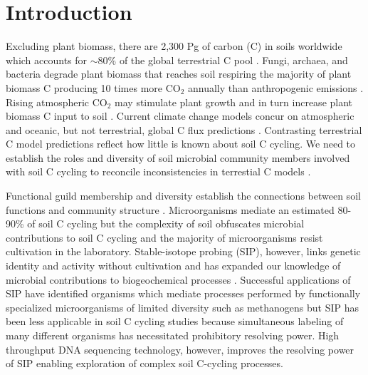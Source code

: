 \section{Introduction}
Excluding plant biomass, there are 2,300 Pg of carbon (C) in soils
worldwide which accounts for $\sim$80\% of the global terrestrial C pool
\citep{Amundson_2001,BATJES_1996}. Fungi, archaea, and bacteria degrade plant
biomass that reaches soil respiring the majority of plant biomass C producing
10 times more CO$_{2}$ annually than anthropogenic emissions
\citep{chapin2002principles}. Rising atmospheric CO$_{2}$ may stimulate plant
growth and in turn increase plant biomass C input to soil
\citep{Groenigen_2006}. Current climate change models concur on atmospheric and
oceanic, but not terrestrial, global C flux predictions
\citep{Friedlingstein_2006}. Contrasting terrestrial C model predictions
reflect how little is known about soil C cycling. We need to establish the
roles and diversity of soil microbial community members involved with soil
C cycling to reconcile inconsistencies in terrestial C models
\citep{Neff_2001,McGuire2010a}.

Functional guild membership and diversity establish the connections between
soil functions and community structure \citep{O_Donnell_2002}. Microorganisms
mediate an estimated 80-90\% of soil C cycling
\citep{ColemanCrossley_1996,Nannipieri_2003} but the complexity of soil
obfuscates microbial contributions to soil C cycling and the majority of
microorganisms resist cultivation in the laboratory. Stable-isotope probing
(SIP), however, links genetic identity and activity without cultivation and has
expanded our knowledge of microbial contributions to biogeochemical processes
\citep{Chen_Murrell_2010}. Successful applications of SIP have identified
organisms which mediate processes performed by functionally specialized
microorganisms of limited diversity such as methanogens \citep{Lu_2005} but SIP
has been less applicable in soil C cycling studies because simultaneous
labeling of many different organisms has necessitated prohibitory resolving
power. High throughput DNA sequencing technology, however, improves the
resolving power of SIP enabling exploration of complex soil C-cycling
processes.

